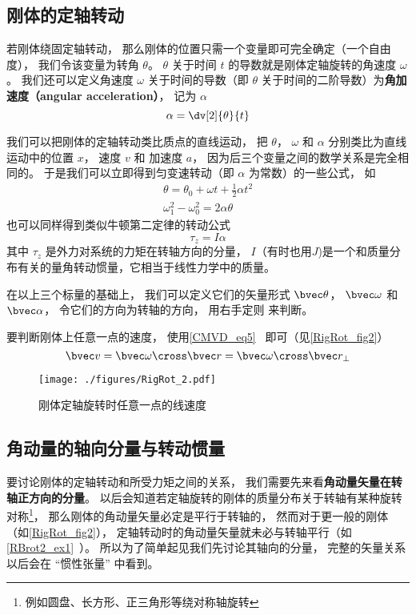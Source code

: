

\subsection{刚体的定轴转动}
若刚体绕固定轴转动， 那么刚体的位置只需一个变量即可完全确定（一个自由度）， 我们令该变量为转角 $\theta$。 $\theta$ 关于时间 $t$ 的导数就是刚体定轴旋转的角速度 $\omega$。 我们还可以定义角速度 $\omega$ 关于时间的导数（即 $\theta$ 关于时间的二阶导数）为\textbf{角加速度（angular acceleration）}， 记为 $\alpha$
\begin{equation}
\alpha = \dv[2]{\theta}{t}
\end{equation}

我们可以把刚体的定轴转动类比质点的直线运动， 把 $\theta$， $\omega$ 和 $\alpha$ 分别类比为直线运动中的位置 $x$， 速度 $v$ 和 加速度 $a$， 因为后三个变量之间的数学关系是完全相同的。 于是我们可以立即得到匀变速转动（即 $\alpha$ 为常数）的一些公式， 如
\begin{gather}
\theta = \theta_0 + \omega t + \frac12 \alpha t^2\\
\omega_1^2 - \omega_0^2 = 2\alpha \theta
\end{gather}
也可以同样得到类似牛顿第二定律的转动公式
\begin{equation}
\tau_z = I \alpha
\end{equation}
其中 $\tau_z$ 是外力对系统的力矩在转轴方向的分量， $I$（有时也用$J$)是一个和质量分布有关的量角转动惯量，它相当于线性力学中的质量。

在以上三个标量的基础上， 我们可以定义它们的矢量形式 $\bvec \theta$， $\bvec \omega$ 和 $\bvec \alpha$， 令它们的方向为转轴的方向， 用右手定则 来判断。

要判断刚体上任意一点的速度， 使用\autoref{CMVD_eq5}~ 即可（见\autoref{RigRot_fig2}）
\begin{equation}
\bvec v = \bvec \omega \cross \bvec r = \bvec \omega \cross \bvec r_\bot
\end{equation}

\begin{figure}[ht]
\centering
\texttt{[image: ./figures/RigRot\_2.pdf]}
\caption{刚体定轴旋转时任意一点的线速度} \label{RigRot_fig2}
\end{figure}

\subsection{角动量的轴向分量与转动惯量}
要讨论刚体的定轴转动和所受力矩之间的关系， 我们需要先来看\textbf{角动量矢量在转轴正方向的分量}。 以后会知道若定轴旋转的刚体的质量分布关于转轴有某种旋转对称\footnote{例如圆盘、长方形、正三角形等绕对称轴旋转}， 那么刚体的角动量矢量必定是平行于转轴的， 然而对于更一般的刚体（如\autoref{RigRot_fig2}）， 定轴转动时的角动量矢量就未必与转轴平行（如\autoref{RBrot2_ex1}~）。 所以为了简单起见我们先讨论其轴向的分量， 完整的矢量关系以后会在 “惯性张量” 中看到。

